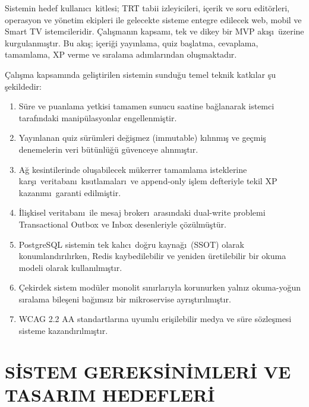 \documentclass[conference,a4paper]{IEEEtran}
\begin{document}
Sistemin hedef kullan\i c\i\ kitlesi; TRT tabii izleyicileri, i\c{c}erik ve soru edit\"{o}rleri, operasyon ve y\"{o}netim ekipleri ile gelecekte sisteme entegre edilecek web, mobil ve Smart TV istemcileridir. \c{C}al\i\c{s}man\i n kapsam\i, tek ve dikey bir MVP ak\i\c{s}\i\ \"{u}zerine kurgulanm\i\c{s}t\i r. Bu ak\i\c{s}; i\c{c}eri\u{g}i yay\i nlama, quiz ba\c{s}latma, cevaplama, tamamlama, XP verme ve s\i ralama ad\i mlar\i ndan olu\c{s}maktad\i r.

\c{C}al\i\c{s}ma kapsam\i nda geli\c{s}tirilen sistemin sundu\u{g}u temel teknik katk\i lar \c{s}u \c{s}ekildedir:
\begin{enumerate}
    \item S\"{u}re ve puanlama yetkisi tamamen sunucu saatine ba\u{g}lanarak istemci taraf\i ndaki manip\"{u}lasyonlar engellenmi\c{s}tir.
    \item Yay\i nlanan quiz s\"{u}r\"{u}mleri de\u{g}i\c{s}mez (immutable) k\i l\i nm\i\c{s} ve ge\c{c}mi\c{s} denemelerin veri b\"{u}t\"{u}nl\"{u}\u{g}\"{u} g\"{u}venceye al\i nm\i\c{s}t\i r.
    \item A\u{g} kesintilerinde olu\c{s}abilecek m\"{u}kerrer tamamlama isteklerine kar\c{s}\i\ veritaban\i\ k\i s\i tlamalar\i\ ve append-only i\c{s}lem defteriyle tekil XP kazan\i m\i\ garanti edilmi\c{s}tir.
    \item \.{I}li\c{s}kisel veritaban\i\ ile mesaj broker\i\ aras\i ndaki dual-write problemi Transactional Outbox ve Inbox desenleriyle \c{c}\"{o}z\"{u}lm\"{u}\c{s}t\"{u}r.
    \item PostgreSQL sistemin tek kal\i c\i\ do\u{g}ru kayna\u{g}\i\ (SSOT) olarak konumland\i r\i l\i rken, Redis kaybedilebilir ve yeniden \"{u}retilebilir bir okuma modeli olarak kullan\i lm\i\c{s}t\i r.
    \item \c{C}ekirdek sistem mod\"{u}ler monolit s\i n\i rlar\i yla korunurken yaln\i z okuma-yo\u{g}un s\i ralama bile\c{s}eni ba\u{g}\i ms\i z bir mikroservise ayr\i\c{s}t\i r\i lm\i\c{s}t\i r.
    \item WCAG 2.2 AA standartlar\i na uyumlu eri\c{s}ilebilir medya ve s\"{u}re s\"{o}zle\c{s}mesi sisteme kazand\i r\i lm\i\c{s}t\i r.
\end{enumerate}

\section{S\.{I}STEM GEREKS\.{I}N\.{I}MLER\.{I} VE TASARIM HEDEFLER\.{I}}
\end{document}
